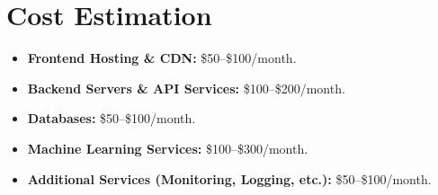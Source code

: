 \documentclass[11pt]{article}
\begin{document}
\newpage
\section{Cost Estimation}
\begin{itemize}[noitemsep]
    \item \textbf{Frontend Hosting \& CDN:} \$50--\$100/month.
    \item \textbf{Backend Servers \& API Services:} \$100--\$200/month.
    \item \textbf{Databases:} \$50--\$100/month.
    \item \textbf{Machine Learning Services:} \$100--\$300/month.
    \item \textbf{Additional Services (Monitoring, Logging, etc.):} \$50--\$100/month.
\end{itemize}
\end{document}
